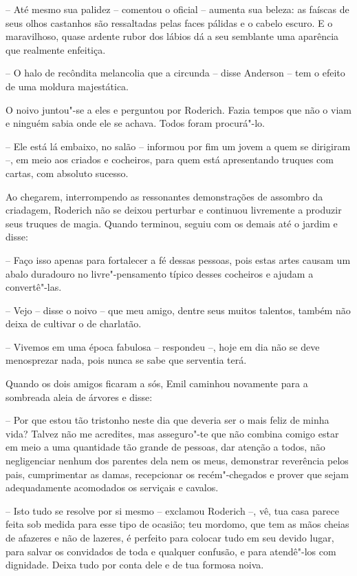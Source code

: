 -- Até mesmo sua palidez -- comentou o oficial -- aumenta sua beleza:
as faíscas de seus olhos castanhos são ressaltadas pelas faces pálidas
e o cabelo escuro. E o maravilhoso, quase ardente rubor dos
lábios dá a seu semblante uma aparência que realmente enfeitiça.

-- O halo de recôndita melancolia que a circunda -- disse Anderson --
tem o efeito de uma moldura majestática.

O noivo juntou"-se a eles e perguntou por Roderich. Fazia tempos que não
o viam e ninguém sabia onde ele se achava. Todos foram procurá"-lo.

-- Ele está lá embaixo, no salão -- informou por fim um jovem a quem
se dirigiram --, em meio aos criados e cocheiros, para quem está
apresentando truques com cartas, com absoluto sucesso.

Ao chegarem, interrompendo as ressonantes demonstrações de assombro da
criadagem, Roderich não se deixou perturbar e continuou livremente a
produzir seus truques de magia. Quando terminou, seguiu com os demais
até o jardim e disse:

-- Faço isso apenas para fortalecer a fé dessas pessoas, pois estas
artes causam um abalo duradouro no livre"-pensamento típico desses
cocheiros e ajudam a convertê"-las.

-- Vejo -- disse o noivo -- que meu amigo, dentre seus muitos talentos,
também não deixa de cultivar o de charlatão.

-- Vivemos em uma época fabulosa -- respondeu --, hoje em dia não
se deve menosprezar nada, pois nunca se sabe que serventia terá.

Quando os dois amigos ficaram a sós, Emil caminhou novamente para a
sombreada aleia de árvores e disse:

-- Por que estou tão tristonho neste dia que deveria ser o mais
feliz de minha vida? Talvez não me acredites, mas asseguro"-te que não
combina comigo estar em meio a uma quantidade tão grande de pessoas,
dar atenção a todos, não negligenciar nenhum dos parentes dela nem os meus,
demonstrar reverência pelos pais, cumprimentar as damas, recepcionar os
recém"-chegados e prover que sejam adequadamente acomodados os serviçais
e cavalos.

-- Isto tudo se resolve por si mesmo -- exclamou Roderich --, vê, tua
casa parece feita sob medida para esse tipo de ocasião; teu mordomo,
que tem as mãos cheias de afazeres e não de lazeres, é perfeito para
colocar tudo em seu devido lugar, para salvar os convidados de toda e
qualquer confusão, e para atendê"-los com dignidade. Deixa tudo por
conta dele e de tua formosa noiva.

